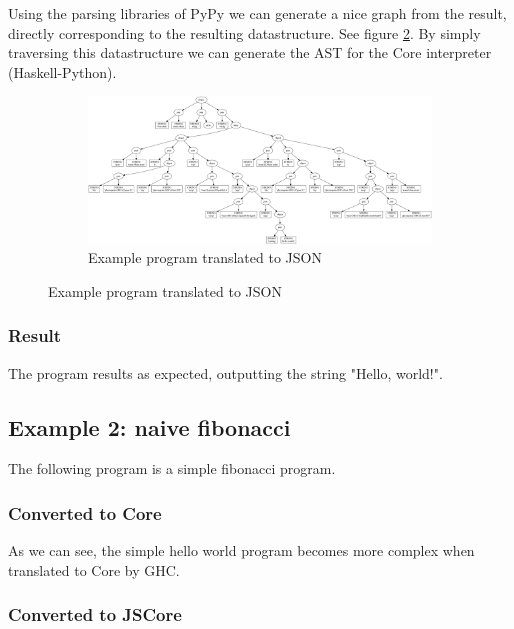 Using the parsing libraries of PyPy we can generate a nice graph from the result,
directly corresponding to the resulting datastructure. 
See figure \ref{fig:helloworldgraph}.
By simply traversing this datastructure we can generate the AST for the Core 
interpreter (Haskell-Python).

\begin{figure}
\begin{figure}[H]
\includegraphics[width=\textwidth]{../interpreter/tests/helloworld.png}
\caption{Example program translated to JSON}
\label{fig:helloworldgraph}
\end{figure}
\end{figure}

\subsubsection{Result}

The program results as expected, outputting the string "Hello, world!".


\subsection{Example 2: naive fibonacci}

The following program is a simple fibonacci program.



\subsubsection{Converted to Core}

As we can see, the simple hello world program becomes more complex when translated
to Core by GHC.



\subsubsection{Converted to JSCore}

